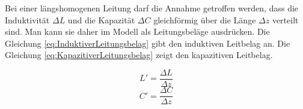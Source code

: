 Bei einer längshomogenen Leitung darf die Annahme getroffen werden, dass die Induktivität $\Delta L$ und die Kapazität $\Delta C$ gleichförmig über die Länge $\Delta z$ verteilt sind. Man kann sie daher im Modell als Leitungsbeläge ausdrücken. Die Gleichung \ref{eq:InduktiverLeitungsbelag} gibt den induktiven Leitbelag an. Die Gleichung \ref{eq:KapazitiverLeitungsbelag} zeigt den kapazitiven Leitbelag.

\begin{equation}
L'=\dfrac{\Delta L}{\Delta z}\label{eq:InduktiverLeitungsbelag}
\end{equation}
\begin{equation}
C'=\dfrac{\Delta C}{\Delta z}\label{eq:KapazitiverLeitungsbelag}
\end{equation}






